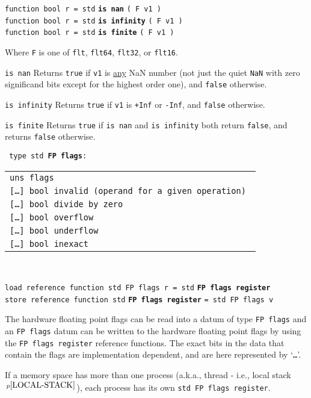 \documentclass[12pt]{article}
\newcommand{\ttkey}[1]{{\tt \bfseries #1}}
\newcommand{\pagnote}[1]{$\,^{p\pageref{#1}}$}
\newenvironment{indpar}[1][0.3in]%
	{\begin{list}{}%
		     {\setlength{\itemsep}{0in}%
		      \setlength{\topsep}{0in}%
		      \setlength{\parsep}{1ex}%
		      \setlength{\labelwidth}{#1}%
		      \setlength{\leftmargin}{#1}%
		      \addtolength{\leftmargin}{\labelsep}}%
	 \item}%
	{\end{list}}
\newenvironment{itemlist}[1][1.2in]%
	{\begin{list}{}{\setlength{\labelwidth}{#1}%
		        \setlength{\leftmargin}{\labelwidth}%
		        \addtolength{\leftmargin}{+0.2in}%
		        \renewcommand{\makelabel}[1]{##1\hfill}}}%
	{\end{list}}
\begin{document}
{\tt function bool r = std} \ttkey{is nan} {\tt ( F v1 )} \\
{\tt function bool r = std} \ttkey{is infinity} {\tt ( F v1 )} \\
{\tt function bool r = std} \ttkey{is finite} {\tt ( F v1 )}
\begin{indpar}
Where {\tt F} is one of {\tt flt}, {\tt flt64}, {\tt flt32}, or {\tt flt16}.
\begin{itemlist}
\item[\tt is nan]
Returns {\tt true} if {\tt v1} is \underline{any} NaN number
(not just the quiet {\tt NaN} with zero significand bits except for
the highest order one),
and {\tt false} otherwise.
\item[\tt is infinity]
Returns {\tt true} if {\tt v1} is {\tt +Inf} or {\tt -Inf}, and {\tt false}
otherwise.
\item[\tt is finite]
Returns {\tt true} if {\tt is nan} and {\tt is infinity}
both return {\tt false}, and returns {\tt false} otherwise.
\end{itemlist}
\end{indpar}

{\tt
type~std~\ttkey{FP flags}:\label{FP-FLAGS} \\
\begin{tabular}[t]{@{~~~~~}l}
\tt uns flags \\
\tt [\ldots] bool invalid (operand for a given operation) \\
\tt [\ldots] bool divide by zero \\
\tt [\ldots] bool overflow \\
\tt [\ldots] bool underflow \\
\tt [\ldots] bool inexact \\
\end{tabular} \\
}
{\tt load reference function std FP flags r = std} \ttkey{FP flags register} \\
{\tt store reference function std}
    \ttkey{FP flags register} {\tt = std FP flags v}
\begin{indpar}
The hardware floating point flags can be read into a datum of type
{\tt FP flags} and an {\tt FP flags} datum can be written
to the hardware floating point flags by using the {\tt FP flags register}
reference functions.  The exact bits in the data that contain the flags
are implementation dependent, and are here represented by `{\tt \ldots{}}'.
\end{indpar}

If a memory space has more than one process (a.k.a., thread - i.e., local
stack\pagnote{LOCAL-STACK}), each process has its own
{\tt std FP flags register}.
\end{document}
